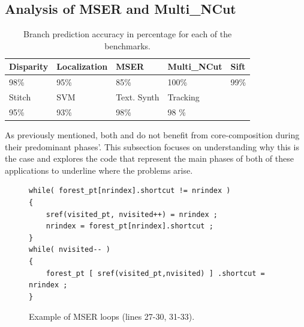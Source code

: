 \subsection{Analysis of MSER and Multi\_NCut}

\begin{table}[t]
  \small
  \centering
 \begin{tabular} { | l | l | l | l | l | }
 \hline
   \cellcolor[gray]{0.7}Disparity & \cellcolor[gray]{0.7} Localization& \cellcolor[gray]{0.7} MSER& \cellcolor[gray]{0.7} Multi\_NCut& \cellcolor[gray]{0.7} Sift\\ \hline
	98\%  & 95\% & 85\%  & 100\%& 99\%\\ \hline
	 \cellcolor[gray]{0.7} Stitch & \cellcolor[gray]{0.7} SVM & \cellcolor[gray]{0.7} Text. Synth & \cellcolor[gray]{0.7} Tracking&\\ \hline
	  95\%& 93\%& 98\%& 98 \%&\\ \hline
	\end{tabular}
  \caption{Branch prediction accuracy in percentage for each of the benchmarks.}\label{tab:sd-vbsbpred}
  \vspace{1em}
\end{table}

As previously mentioned, both  and  do not benefit from core-composition during their predominant phases'.
This subsection focuses on understanding why this is the case and explores the code that represent the main phases of both of these applications to underline where the problems arise.

\begin{figure}[t]
\lstset{language=C,numbersep=4pt}
\begin{center}
\begin{lstlisting}
while( forest_pt[nrindex].shortcut != nrindex ) 
{          
	sref(visited_pt, nvisited++) = nrindex ;
	nrindex = forest_pt[nrindex].shortcut ;
}      
while( nvisited-- ) 
{
	forest_pt [ sref(visited_pt,nvisited) ] .shortcut = nrindex ;
}
\end{lstlisting}
\end{center}
\vspace{-1em}
\caption{Example of MSER loops (lines 27-30, 31-33).}
\label{lst:mser-ex}
\end{figure}


